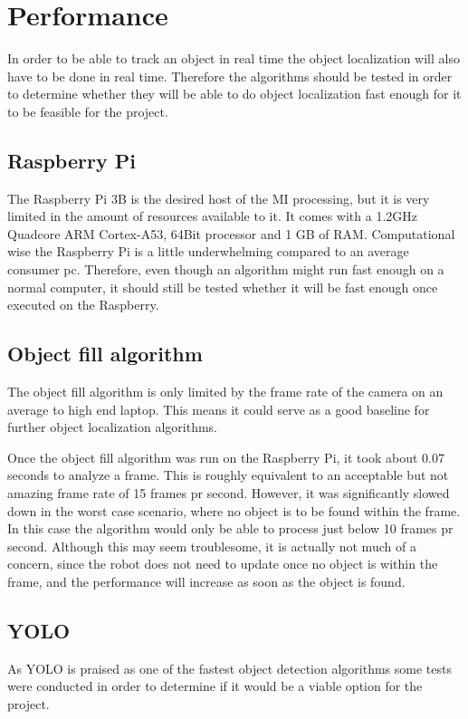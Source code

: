\section{Performance}

In order to be able to track an object in real time the object localization will also have to be done in real time.
Therefore the algorithms should be tested in order to determine whether they will be able to do object localization fast enough for it to be feasible for the project.


\subsection{Raspberry Pi}
The Raspberry Pi 3B is the desired host of the MI processing, but it is very limited in the amount of resources available to it.
It comes with a 1.2GHz Quadcore ARM Cortex-A53, 64Bit processor and 1 GB of RAM.
Computational wise the Raspberry Pi is a little underwhelming compared to an average consumer pc.
Therefore, even though an algorithm might run fast enough on a normal computer, it should still be tested whether it will be fast enough once executed on the Raspberry.

\subsection{Object fill algorithm}
The object fill algorithm is only limited by the frame rate of the camera on an average to high end laptop.
This means it could serve as a good baseline for further object localization algorithms.

Once the object fill algorithm was run on the Raspberry Pi, it took about 0.07 seconds to analyze a frame.
This is roughly equivalent to an acceptable but not amazing frame rate of 15 frames pr second.
However, it was significantly slowed down in the worst case scenario, where no object is to be found within the frame.
In this case the algorithm would only be able to process just below 10 frames pr second.
Although this may seem troublesome, it is actually not much of a concern, since the robot does not need to update once no object is within the frame, and the performance will increase as soon as the object is found.

\subsection{YOLO}

As YOLO is praised as one of the fastest object detection algorithms some tests were conducted in order to determine if it would be a viable option for the project.

